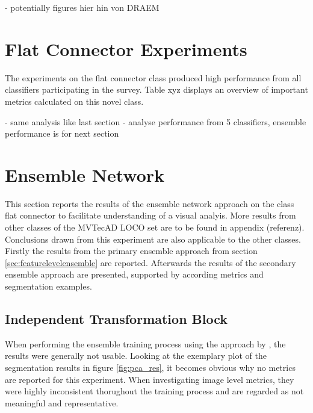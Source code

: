 - potentially figures hier hin von DRAEM






\section{Flat Connector Experiments}
\label{sec:faltconnectorxperiments}

The experiments on the flat connector class produced high performance from all classifiers participating in the survey. Table xyz 
displays an overview of important metrics calculated on this novel class.




- same analysis like last section\newline
- analyse performance from 5 classifiers, ensemble performance is for next section


\section{Ensemble Network}
\label{sec:ensembleresults}

This section reports the results of the ensemble network approach on the class flat connector to facilitate understanding of a visual 
analyis. More results from other classes of the MVTecAD LOCO \cite{LOCODentsAndScratchesBergmann2022} set are to be found in appendix (referenz). Conclusions drawn from this 
experiment are also applicable to the other classes. Firstly the results from the primary ensemble approach from section \ref{sec:featurelevelensemble} are reported. Afterwards 
the results of the secondary ensemble approach are presented, supported by according metrics and segmentation examples.


\subsection{Independent Transformation Block}
\label{subsec:ITBfail}

When performing the ensemble training process using the approach by \cite{EnsembleHeller2023}, the results were generally not usable. Looking at the exemplary plot of the segmentation 
results in figure \ref{fig:pca_res}, it becomes obvious why no metrics are reported for this experiment. When investigating image level metrics, they were highly inconsistent thorughout 
the training process and are regarded as not meaningful and representative.

